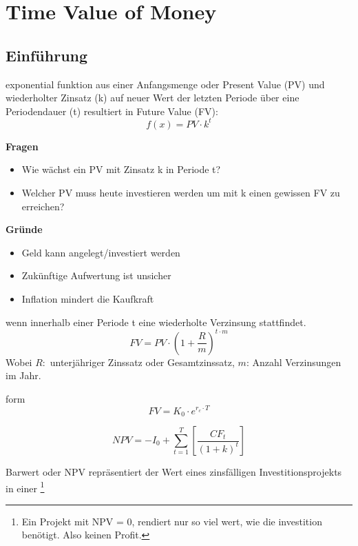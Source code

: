 \pagebreak
{}

\section{Time Value of Money}

\subsection{Einführung}

\begin{definition}
     exponential funktion aus einer Anfangsmenge oder Present Value (PV) und wiederholter Zinsatz (k) auf neuer Wert der letzten Periode über eine Periodendauer (t) resultiert in Future Value (FV):
    \begin{equation}
        f(x) = PV \cdot k^t
    \end{equation}
\end{definition}
\textbf{Fragen}
\begin{itemize}
    \item Wie wächst ein PV mit Zinsatz k in Periode t?
    \item Welcher PV muss heute investieren werden um mit k einen gewissen FV zu erreichen?
\end{itemize}
\textbf{Gründe}
\begin{itemize}
    \item Geld kann angelegt/investiert werden
    \item Zukünftige Aufwertung ist unsicher
    \item Inflation mindert die Kaufkraft
\end{itemize}

\begin{definition}
     wenn innerhalb einer Periode t eine wiederholte Verzinsung stattfindet.
    \begin{equation}
        FV = PV \cdot (1+\frac{R}{m})^{t\cdot m}
    \end{equation} 
    Wobei $R:$ unterjähriger Zinssatz oder Gesamtzinssatz, $m$: Anzahl Verzinsungen im Jahr.
\end{definition}

\begin{definition}
     form 
    \begin{equation}
        FV = K_0 \cdot e^{r_c \cdot T}
    \end{equation}
\end{definition}    

\begin{definition}
    \begin{equation}
        NPV = - I_0 + \sum_{t=1}^{T}\left[\frac{CF_t}{(1 + k)^t}\right]
    \end{equation}
\end{definition}

Barwert oder NPV repräsentiert der Wert eines zinsfälligen Investitionsprojekts in einer \footnote{Ein Projekt mit NPV  = 0, rendiert nur so viel wert, wie die investition benötigt. Also keinen Profit.}